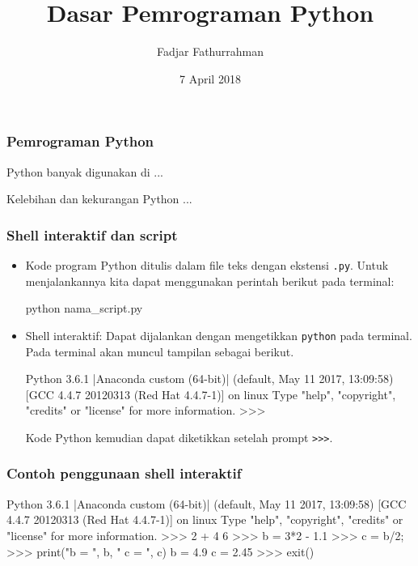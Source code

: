 \documentclass[bahasa,10pt]{beamer}
\begin{document}
\title{Dasar Pemrograman Python}
\author{Fadjar Fathurrahman}
\date{7 April 2018}

\frame{\titlepage}

\begin{frame}
\frametitle{Pemrograman Python}

Python banyak digunakan di ...

Kelebihan dan kekurangan Python ...

\end{frame}


\begin{frame}[fragile]
\frametitle{Shell interaktif dan script}

\begin{itemize}

  \item Kode program Python ditulis dalam file teks dengan ekstensi \texttt{.py}.
  Untuk menjalankannya kita dapat menggunakan perintah berikut pada terminal:
\begin{bashcode}
python nama_script.py
\end{bashcode}

  \item Shell interaktif: Dapat dijalankan dengan mengetikkan \texttt{python} pada
  terminal. Pada terminal akan muncul tampilan sebagai berikut.
\begin{textcode}
Python 3.6.1 |Anaconda custom (64-bit)| (default, May 11 2017, 13:09:58) 
[GCC 4.4.7 20120313 (Red Hat 4.4.7-1)] on linux
Type "help", "copyright", "credits" or "license" for more information.
>>>
\end{textcode}
  Kode Python kemudian dapat diketikkan setelah prompt \texttt{>>>}.

\end{itemize}

\end{frame}


\begin{frame}[fragile]
\frametitle{Contoh penggunaan shell interaktif}

\begin{textcode}
Python 3.6.1 |Anaconda custom (64-bit)| (default, May 11 2017, 13:09:58) 
[GCC 4.4.7 20120313 (Red Hat 4.4.7-1)] on linux
Type "help", "copyright", "credits" or "license" for more information.
>>> 2 + 4
6
>>> b = 3*2 - 1.1
>>> c = b/2;
>>> print("b = ", b, " c = ", c)
b =  4.9  c =  2.45
>>> exit()
\end{textcode}

\end{frame}
\end{document}
